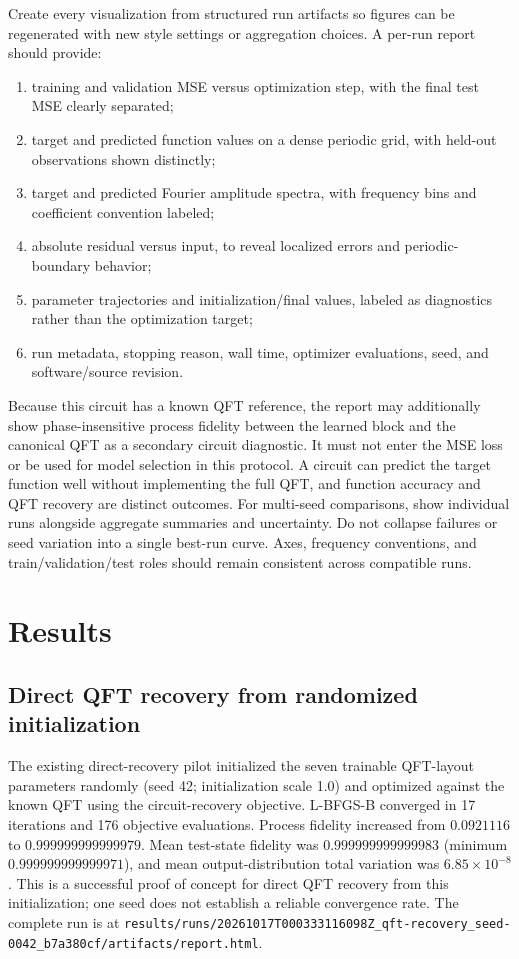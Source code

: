 \documentclass[11pt]{article}
\begin{document}
Create every visualization from structured run artifacts so figures can be regenerated with new style settings or aggregation choices. A per-run report should provide:
\begin{enumerate}[leftmargin=*]
  \item training and validation MSE versus optimization step, with the final test MSE clearly separated;
  \item target and predicted function values on a dense periodic grid, with held-out observations shown distinctly;
  \item target and predicted Fourier amplitude spectra, with frequency bins and coefficient convention labeled;
  \item absolute residual versus input, to reveal localized errors and periodic-boundary behavior;
  \item parameter trajectories and initialization/final values, labeled as diagnostics rather than the optimization target;
  \item run metadata, stopping reason, wall time, optimizer evaluations, seed, and software/source revision.
\end{enumerate}
Because this circuit has a known QFT reference, the report may additionally show phase-insensitive process fidelity between the learned block and the canonical QFT as a secondary circuit diagnostic. It must not enter the MSE loss or be used for model selection in this protocol. A circuit can predict the target function well without implementing the full QFT, and function accuracy and QFT recovery are distinct outcomes.
For multi-seed comparisons, show individual runs alongside aggregate summaries and uncertainty. Do not collapse failures or seed variation into a single best-run curve. Axes, frequency conventions, and train/validation/test roles should remain consistent across compatible runs.

\section{Results}

\subsection{Direct QFT recovery from randomized initialization}

The existing direct-recovery pilot initialized the seven trainable QFT-layout parameters randomly (seed 42; initialization scale 1.0) and optimized against the known QFT using the circuit-recovery objective. L-BFGS-B converged in 17 iterations and 176 objective evaluations. Process fidelity increased from $0.0921116$ to $0.999999999999979$. Mean test-state fidelity was $0.999999999999983$ (minimum $0.999999999999971$), and mean output-distribution total variation was $6.85\times10^{-8}$. This is a successful proof of concept for direct QFT recovery from this initialization; one seed does not establish a reliable convergence rate. The complete run is at \texttt{results/runs/20261017T000333116098Z\_qft-recovery\_seed-0042\_b7a380cf/artifacts/report.html}.
\end{document}
